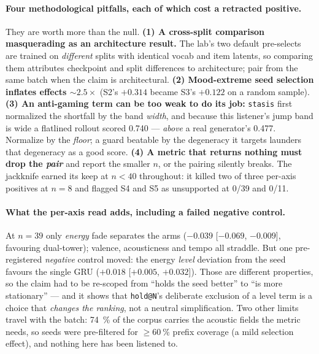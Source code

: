 \documentclass[11pt]{article}
\begin{document}
\paragraph{Four methodological pitfalls, each of which cost a retracted
positive.} They are worth more than the null. \textbf{(1) A cross-split comparison
masquerading as an architecture result.} The lab's two default pre-selects are
trained on \emph{different} splits with identical vocab and item latents, so
comparing them attributes checkpoint and split differences to architecture; pair
from the same batch when the claim is architectural. \textbf{(2) Mood-extreme seed
selection inflates effects ${\sim}\num{2.5}\times$} (S2's $+\num{0.314}$ became
S3's $+\num{0.122}$ on a random sample). \textbf{(3) An anti-gaming term can be
too weak to do its job:} \texttt{stasis} first normalized the shortfall by the
band \emph{width}, and because this listener's jump band is wide a flatlined
rollout scored \num{0.740} --- \emph{above} a real generator's \num{0.477}.
Normalize by the \emph{floor}; a guard beatable by the degeneracy it targets
launders that degeneracy as a good score. \textbf{(4) A metric that returns
nothing must drop the \emph{pair}} and report the smaller $n$, or the pairing
silently breaks. The jackknife earned its keep at $n<40$ throughout: it killed two
of three per-axis positives at $n=8$ and flagged S4 and S5 as unsupported at 0/39
and 0/11.

\paragraph{What the per-axis read adds, including a failed negative control.} At
$n=\num{39}$ only \emph{energy} fade separates the arms ($-\num{0.039}$
[$-\num{0.069}$, $-\num{0.009}$], favouring dual-tower); valence, acousticness and
tempo all straddle. But one pre-registered \emph{negative} control moved: the
energy \emph{level} deviation from the seed favours the single GRU
($+\num{0.018}$ [$+\num{0.005}$, $+\num{0.032}$]). Those are different properties,
so the claim had to be re-scoped from ``holds the seed better'' to ``is more
stationary'' --- and it shows that \texttt{hold@N}'s deliberate exclusion of a level
term is a choice that \emph{changes the ranking}, not a neutral simplification.
Two other limits travel with the batch: \SI{74}{\percent} of the corpus carries
the acoustic fields the metric needs, so seeds were pre-filtered for
$\ge\SI{60}{\percent}$ prefix coverage (a mild selection effect), and nothing here
has been listened to.
\end{document}
